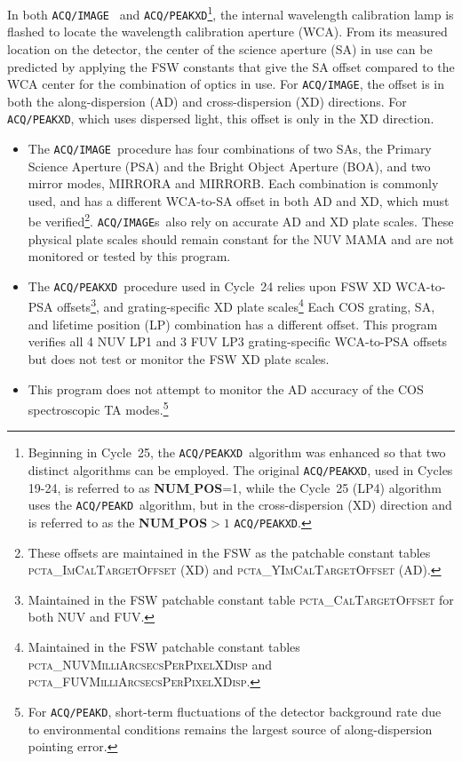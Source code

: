 \documentclass[12pt]{reportj}
\newcommand{\numpos}{{\bf NUM$\_$POS}\rm}
\begin{document}
In both \texttt{ACQ/IMAGE}~ and \texttt{ACQ/PEAKXD}\footnote{Beginning in Cycle~25, the \texttt{ACQ/PEAKXD}~algorithm was enhanced so that two distinct algorithms can be employed.
The original \texttt{ACQ/PEAKXD}, used in Cycles 19-24, is referred to as \numpos=1, while the Cycle~25 (LP4) algorithm
uses the \texttt{ACQ/PEAKD}~algorithm, but in the cross-dispersion (XD) direction and is referred to as the \numpos $ > 1$ \texttt{ACQ/PEAKXD}.},
 the internal wavelength calibration lamp is flashed to locate the wavelength calibration aperture (WCA). From its measured location on the detector, the center of the science aperture (SA) in use can be predicted by applying the FSW constants that give the SA offset compared to the WCA center for the combination of optics in use.
For \texttt{ACQ/IMAGE}, the offset is in both the along-dispersion (AD) and cross-dispersion (XD) directions. For \texttt{ACQ/PEAKXD}, which uses dispersed light, this offset is only in the XD direction.
\begin{itemize}
\item{The \texttt{ACQ/IMAGE}~procedure has four combinations of two SAs, the Primary Science Aperture (PSA) and the Bright Object Aperture (BOA), and two mirror modes, MIRRORA and MIRRORB. Each combination is commonly used, and has a different WCA-to-SA offset in both AD and XD, which must be verified\footnote{These offsets are maintained in the FSW as the patchable constant tables \textsc{pcta\_ImCalTargetOffset} (XD) and \textsc\textsc{pcta\_YImCalTargetOffset} (AD).}. \texttt{ACQ/IMAGE}s~also rely on accurate AD and XD plate scales. These physical plate scales should remain constant for the NUV MAMA and are not monitored or tested by this program.
}
\item{The \texttt{ACQ/PEAKXD}~procedure used in Cycle~24 relies upon FSW XD WCA-to-PSA offsets\footnote{Maintained in the FSW patchable constant table \textsc{pcta\_CalTargetOffset} for both NUV and FUV.}, and grating-specific XD plate scales\footnote{Maintained in the FSW patchable constant tables \textsc{pcta\_NUVMilliArcsecsPerPixelXDisp} and \textsc{pcta\_FUVMilliArcsecsPerPixelXDisp}.}
Each COS grating, SA, and lifetime position (LP) combination has a different offset. This program verifies all 4 NUV LP1 and 3 FUV LP3 grating-specific WCA-to-PSA offsets but does not test or monitor the FSW XD plate scales.
}
\item{This program does not attempt to monitor the AD accuracy of the COS spectroscopic TA modes.\footnote{For \texttt{ACQ/PEAKD}, short-term fluctuations of the detector background rate due to environmental conditions remains the largest source of along-dispersion pointing error.}
}
\end{itemize}
\end{document}
